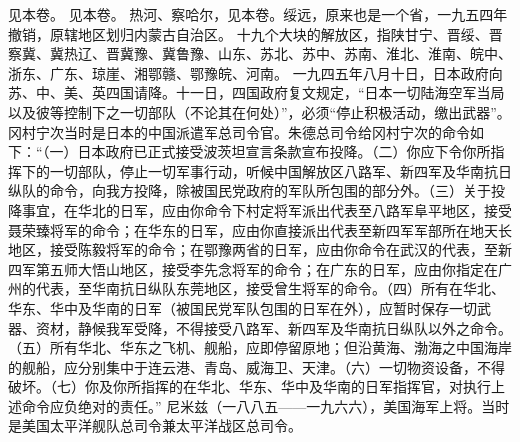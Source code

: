 \begin{maonote}
见本卷。
见本卷。
热河、察哈尔，见本卷。绥远，原来也是一个省，一九五四年撤销，原辖地区划归内蒙古自治区。
十九个大块的解放区，指陕甘宁、晋绥、晋察冀、冀热辽、晋冀豫、冀鲁豫、山东、苏北、苏中、苏南、淮北、淮南、皖中、浙东、广东、琼崖、湘鄂赣、鄂豫皖、河南。
一九四五年八月十日，日本政府向苏、中、美、英四国请降。十一日，四国政府复文规定，“日本一切陆海空军当局以及彼等控制下之一切部队（不论其在何处）”，必须“停止积极活动，缴出武器”。
冈村宁次当时是日本的中国派遣军总司令官。朱德总司令给冈村宁次的命令如下：“（一）日本政府已正式接受波茨坦宣言条款宣布投降。（二）你应下令你所指挥下的一切部队，停止一切军事行动，听候中国解放区八路军、新四军及华南抗日纵队的命令，向我方投降，除被国民党政府的军队所包围的部分外。（三）关于投降事宜，在华北的日军，应由你命令下村定将军派出代表至八路军阜平地区，接受聂荣臻将军的命令；在华东的日军，应由你直接派出代表至新四军军部所在地天长地区，接受陈毅将军的命令；在鄂豫两省的日军，应由你命令在武汉的代表，至新四军第五师大悟山地区，接受李先念将军的命令；在广东的日军，应由你指定在广州的代表，至华南抗日纵队东莞地区，接受曾生将军的命令。（四）所有在华北、华东、华中及华南的日军（被国民党军队包围的日军在外），应暂时保存一切武器、资材，静候我军受降，不得接受八路军、新四军及华南抗日纵队以外之命令。（五）所有华北、华东之飞机、舰船，应即停留原地；但沿黄海、渤海之中国海岸的舰船，应分别集中于连云港、青岛、威海卫、天津。（六）一切物资设备，不得破坏。（七）你及你所指挥的在华北、华东、华中及华南的日军指挥官，对执行上述命令应负绝对的责任。”
尼米兹（一八八五——一九六六），美国海军上将。当时是美国太平洋舰队总司令兼太平洋战区总司令。
\end{maonote}
